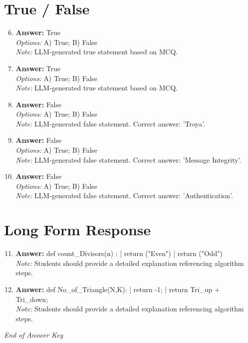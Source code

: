 \documentclass[12pt]{article}
\begin{document}
\section*{True / False}
\begin{enumerate}[label=\arabic*.]
\setcounter{enumi}{5}
\item \textbf{Answer:} True
\\ \textit{Options:} A) True; B) False
\\ \textit{Note:} LLM-generated true statement based on MCQ.
\item \textbf{Answer:} True
\\ \textit{Options:} A) True; B) False
\\ \textit{Note:} LLM-generated true statement based on MCQ.
\item \textbf{Answer:} False
\\ \textit{Options:} A) True; B) False
\\ \textit{Note:} LLM-generated false statement. Correct answer: 'Troya'.
\item \textbf{Answer:} False
\\ \textit{Options:} A) True; B) False
\\ \textit{Note:} LLM-generated false statement. Correct answer: 'Message Integrity'.
\item \textbf{Answer:} False
\\ \textit{Options:} A) True; B) False
\\ \textit{Note:} LLM-generated false statement. Correct answer: 'Authentication'.
\end{enumerate}

\section*{Long Form Response}
\begin{enumerate}[label=\arabic*.]
\setcounter{enumi}{10}
\item \textbf{Answer:} def count\_Divisors(n) : | return ("Even") | return ("Odd")
\\ \textit{Note:} Students should provide a detailed explanation referencing algorithm steps.
\item \textbf{Answer:} def No\_of\_Triangle(N,K): | return -1; | return Tri\_up + Tri\_down;
\\ \textit{Note:} Students should provide a detailed explanation referencing algorithm steps.
\end{enumerate}

\vfill
\noindent\textit{End of Answer Key}
\end{document}
